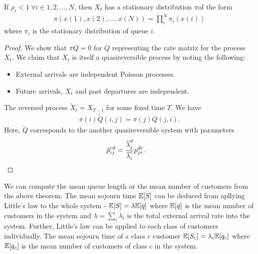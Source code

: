 \documentclass[all-lectures.tex]{subfiles}
\begin{document}
\begin{thm}
If $\rho_i < 1\ \forall i \in {1,2,\dots,N}$, then $X_t$ has a stationary distribution $\pi $of the form 
\begin{align*}
\pi(x(1),x(2),\dots,x(N)) = \prod_{i}^N \pi_i(x(i))
\end{align*}
where $\pi_i$ is the stationary distribution of queue $i$.
\end{thm}
\begin{proof}
We show that $\pi Q = 0$ for $Q$ representing the rate matrix for the process $X_t$. We claim that $X_t$ is itself a quasireversible process by noting the following: 
\begin{itemize}
\item External arrivals are independent Poisson processes. 
\item Future arrivals, $X_t$ and past departures are independent. 
\end{itemize}
The reversed process $\tilde{X}_t = X_{T-t}$ for some fixed time $T$. We have 
\begin{align*}
\pi(i) \tilde{Q}(i,j) = \pi(j) Q(j,i).
\end{align*}
Here, $\tilde{Q}$ corresponds to the another quasireversible system with parameters 
\begin{align*}
\tilde{p}_{ij}^{cd} &= \frac{\overline{\lambda}_j^d}{\overline{\lambda}_i^c} p_{ji}^{dc}. \qedhere
\end{align*} 
\end{proof}
We can compute the mean queue length or the mean number of customers from the above theorem. The mean sojourn time $\mathbb{E}[S]$ can be deduced from apllying Little's law to the whole system - $\mathbb{E}[S] = \lambda \mathbb{E}[q]$ where $\mathbb{E}[q]$ is the mean number of customers in the system and $\lambda = \sum_i \lambda_i$ is the total external arrival rate into the system. Further, Little's law can be applied to each class of customers individually. The mean sojourn time of a class $c$ customer $\mathbb{E}[S_c] = \lambda_c \mathbb{E}[q_c]$ where $\mathbb{E}[q_c]$ is the mean number of customers of class $c$ in the system. 
\end{document}
